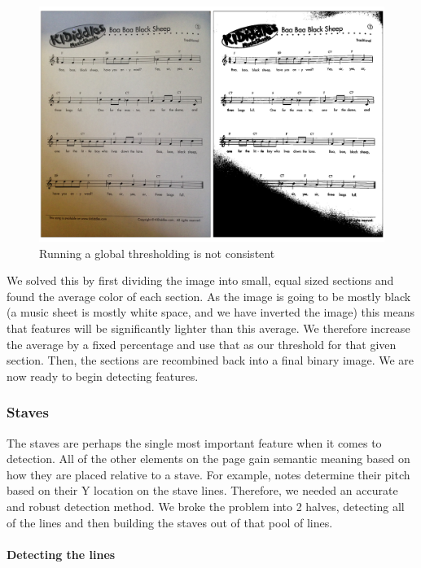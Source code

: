 \begin{figure}[h!]
    \centering
    \includegraphics[width=120mm]{./assets/thresholding.png}
    \caption{Running a global thresholding is not consistent}
    \label{image:thresholding}
\end{figure}

We solved this by first dividing the image into small, equal sized sections and found the average color of each section. As the image is going to be mostly black (a music sheet is mostly white space, and we have inverted the image) this means that features will be significantly lighter than this average. We therefore increase the average by a fixed percentage and use that as our threshold for that given section. Then, the sections are recombined back into a final binary image. We are now ready to begin detecting features.

\subsubsection{Staves}

The staves are perhaps the single most important feature when it comes to detection.  All of the other elements on the page gain semantic meaning based on how they are placed relative to a stave. For example, notes determine their pitch based on their Y location on the stave lines. Therefore, we needed an accurate and robust detection method. We broke the problem into 2 halves, detecting all of the lines and then building the staves out of that pool of lines.

\paragraph{Detecting the lines}

